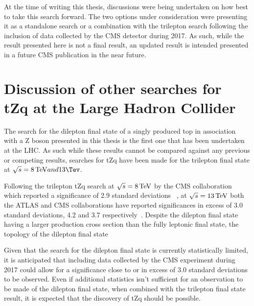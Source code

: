At the time of writing this thesis, discussions were being undertaken on how best to take this search forward.
The two options under consideration were presenting it as a standalone search or a combination with the trilepton search following the inclusion of data collected by the CMS detector during 2017.
As such, while the result presented here is not a final result, an updated result is intended presented in a future CMS publication in the near future.

\section{Discussion of other searches for tZq at the Large Hadron Collider}
The search for the dilepton final state of a singly produced top in association with a Z boson presented in this thesis is the first one that has been undertaken at the LHC.
As such while these results cannot be compared against any previous or competing results, searches for tZq have been made for the trilepton final state at $\sqrt{s} = 8 \TeV and 13 \Tev$.

Following the trilepton tZq search at $\sqrt{s} = 8 \,\text{Te\hspace{-.08em}V}$ by the CMS collaboration which reported a significance of 2.9 standard deviations ~\cite{Sirunyan:2017kkr}, at $\sqrt{s} = 13 \,\text{Te\hspace{-.08em}V}$ both the ATLAS and CMS collaborations  have reported significances in excess of 3.0 standard deviations, 4.2 and 3.7 respectively~\cite{Aaboud:2017ylb,Sirunyan:2017nbr}.
Despite the dilepton final state having a larger production cross section than the fully leptonic final state, the topology of the dilepton final state  

Given that the search for the dilepton final state is currently statistically limited, it is anticipated that including data collected by the CMS experiment during 2017 could allow for a significance close to or in excess of 3.0 standard deviations to be observed.
Even if additional statistics isn't sufficient for an observation to be made of the dilepton final state, when combined with the trilepton final state result, it is expected that the discovery of tZq should be possible.
